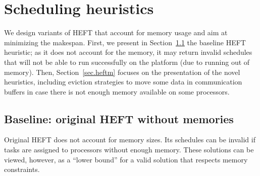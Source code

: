 \documentclass[conference]{IEEEtran}
\begin{document}
%
%
%



\section{Scheduling heuristics}
\label{sec:heuristics}
%
We design variants of HEFT that account for memory usage and aim at minimizing the makespan.
First, we present in Section~\ref{sec.heft} the baseline HEFT heuristic; as it does not account for the memory,
it may return invalid schedules that will not be able to run successfully on the platform (due to 
running out of memory).  Then, Section~\ref{sec.heftm} focuses on the presentation of the novel
heuristics, including eviction strategies to move some data in communication buffers
in case there is not enough memory available on some processors.

\subsection{Baseline: original HEFT without memories}
\label{sec.heft}
%
Original HEFT does not account for memory sizes.
Its schedules can be invalid if tasks are assigned to processors without enough memory.
These solutions can be viewed, however, as a ``lower bound'' for a valid solution that 
respects memory constraints.
\end{document}
